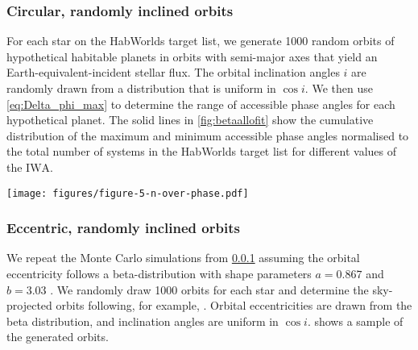 \documentclass[
    usenatbib,
]{mnras}
\newcommand{\IWA}{\ensuremath{\mathrm{IWA}}}
\newcommand{\hwo}{HabWorlds}
\begin{document}
\subsubsection{Circular, randomly inclined orbits}
\label{sec:circular}

For each star on the \hwo{} target list, we generate \num{1000} random orbits of hypothetical habitable planets in orbits with semi-major axes that yield an Earth-equivalent-incident stellar flux. 
%
The orbital inclination angles $i$ are randomly drawn from a distribution 
that is uniform in $\cos i$. 
%
We then use \cref{eq:Delta_phi_max} to determine the range of 
accessible phase angles for each hypothetical planet.
%
The solid lines in \cref{fig:betaallofit} show the cumulative 
distribution of the maximum and minimum accessible phase 
angles normalised to the total number of systems in the \hwo{} 
target list for different values of the \IWA{}.

\begin{figure*}%
    \centering
    \texttt{[image: figures/figure-5-n-over-phase.pdf]}
    \caption{
        The cumulative distributions of the most extreme phase angles accessible for different \IWA{} and for randomly inclined, circular orbits
        (solid lines) and randomly inclined, elliptical orbits (dashed lines).
        The top $x$-axis indicates the minimum and the 
        bottom $x$-axis the maximum accessible phase angle.
        These angles are symmetric about quadrature (90 degrees).
        The $y$-axis on the left indicates the number of planetary systems 
        divided by the number of Monte Carlo samples and is thus normalised to 
        the number of systems on the target list.
        The $y$-axis on the right indicates the number of systems, assuming \qty{24}{\percent} of them have an Earth-like planet in their HZ.
    }
    \label{fig:betaallofit}
\end{figure*}

\subsubsection{Eccentric, randomly inclined orbits}
\label{sec:eccentric}

We repeat the Monte Carlo simulations from \cref{sec:circular} assuming 
the orbital eccentricity follows a beta-distribution with shape parameters 
$a=0.867$ and $b=3.03$ \citep{2013MNRAS.434L..51K}. 
%
We randomly draw \num{1000} orbits for each star and determine the sky-projected orbits following, for example, \citet{2010exop.book...15M}. 
Orbital eccentricities are drawn from the beta distribution, and 
inclination angles are uniform in $\cos i$. 
 shows a sample of the generated orbits.
%
\end{document}
